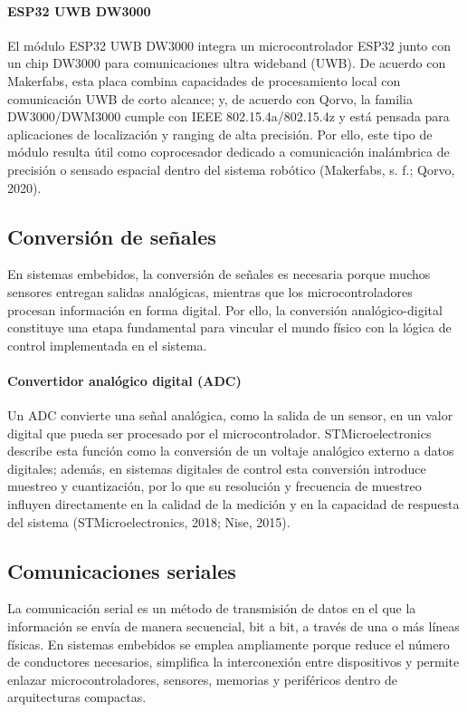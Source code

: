 \paragraph{ESP32 UWB DW3000} El módulo ESP32 UWB DW3000 integra un microcontrolador ESP32 junto con un chip DW3000 para comunicaciones ultra wideband (UWB). De acuerdo con Makerfabs, esta placa combina capacidades de procesamiento local con comunicación UWB de corto alcance; y, de acuerdo con Qorvo, la familia DW3000/DWM3000 cumple con IEEE 802.15.4a/802.15.4z y está pensada para aplicaciones de localización y ranging de alta precisión. Por ello, este tipo de módulo resulta útil como coprocesador dedicado a comunicación inalámbrica de precisión o sensado espacial dentro del sistema robótico (Makerfabs, s. f.; Qorvo, 2020).

\subsection{Conversión de señales}
En sistemas embebidos, la conversión de señales es necesaria porque muchos sensores entregan salidas analógicas, mientras que los microcontroladores procesan información en forma digital. Por ello, la conversión analógico-digital constituye una etapa fundamental para vincular el mundo físico con la lógica de control implementada en el sistema.

\paragraph{Convertidor analógico digital (ADC)} Un ADC convierte una señal analógica, como la salida de un sensor, en un valor digital que pueda ser procesado por el microcontrolador. STMicroelectronics describe esta función como la conversión de un voltaje analógico externo a datos digitales; además, en sistemas digitales de control esta conversión introduce muestreo y cuantización, por lo que su resolución y frecuencia de muestreo influyen directamente en la calidad de la medición y en la capacidad de respuesta del sistema (STMicroelectronics, 2018; Nise, 2015).

\subsection{Comunicaciones seriales}
La comunicación serial es un método de transmisión de datos en el que la información se envía de manera secuencial, bit a bit, a través de una o más líneas físicas. En sistemas embebidos se emplea ampliamente porque reduce el número de conductores necesarios, simplifica la interconexión entre dispositivos y permite enlazar microcontroladores, sensores, memorias y periféricos dentro de arquitecturas compactas.

